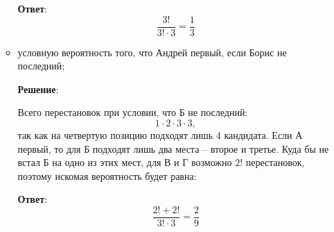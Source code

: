 \documentclass{article}
\begin{document}
\begin{enumerate}
\begin{itemize}
        \textbf{Ответ}:
        $$\dfrac{3!}{3!\cdot3} = \dfrac{1}{3}$$

        \item условную вероятность того, что Андрей первый, если Борис не последний;
                
        \textbf{Решение}:

        Всего перестановок при условии, что Б не последний:
        \begin{equation}
            1\cdot 2\cdot 3\cdot 3,
        \end{equation}
        так как на четвертую позицию подходят лишь 4 кандидата. Если А первый, то для Б подходят лишь два места --  второе и третье. Куда бы не встал Б на одно из этих мест, для В и Г возможно $2!$ перестановок, поэтому искомая вероятность будет равна:

        \textbf{Ответ}:
        $$\dfrac{2!+2!}{3!\cdot3} = \dfrac{2}{9}$$

    \end{itemize}
  \end{enumerate}
\end{document}
